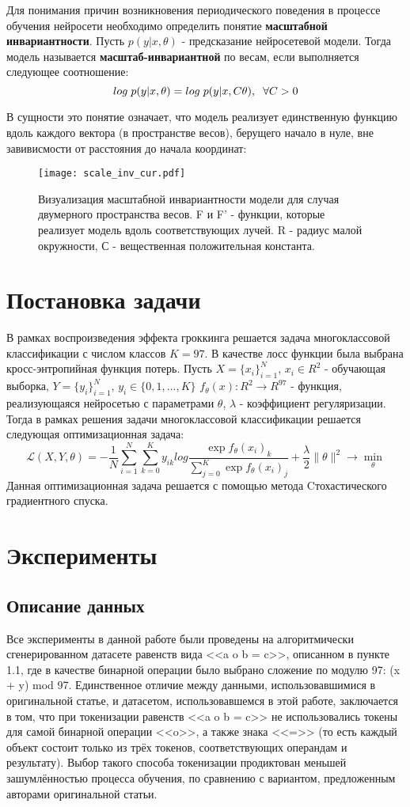 \documentclass{article}
\begin{document}
Для понимания причин возникновения периодического поведения в процессе обучения нейросети необходимо определить понятие \textbf{масштабной инвариантности}. Пусть $p(y|x, \theta)$ - предсказание нейросетевой модели. Тогда модель называется 
\textbf{масштаб-инвариантной} по весам, если выполняется следующее соотношение:
$$log \hspace{1mm} p(y|x, \theta) = log \hspace{1mm} p(y|x, C\theta), \hspace{2mm}\forall C > 0$$
\par В сущности это понятие означает, что модель реализует единственную функцию вдоль каждого вектора (в пространстве весов), берущего начало в нуле, вне завивисмости от расстояния до начала координат:
\begin{figure}[h]
\centering
\texttt{[image: scale\_inv\_cur.pdf]}
\caption{Визуализация масштабной инвариантности модели для случая двумерного пространства весов. F и F' - функции, которые реализует модель вдоль соответствующих лучей. R - радиус малой окружности, С - вещественная положительная константа.}
\label{fig:fig4}
\end{figure}
\section{Постановка задачи}
В рамках воспроизведения эффекта гроккинга решается задача многоклассовой классификации с числом классов $K=97$. В качестве лосс функции была выбрана кросс-энтропийная функция потерь. Пусть $X = \{{x_i}\}_{i=1}^N$, $x_i \in R^2$ - обучающая выборка,  $Y = \{{y_i}\}_{i=1}^N$, $y_i \in \{0, 1, ...,K\}$  $f_{\theta}(x): R^2 \rightarrow R^{97}$ - функция, реализующаяся нейросетью с параметрами $\theta$, $\lambda$ - коэффициент регуляризации. Тогда в рамках решения задачи многоклассовой классификации решается следующая оптимизационная задача:
$$\mathcal{L}(X, Y, \theta) = -\frac{1}{N} \sum_{i=1}^N\sum_{k=0}^K{y_{ik} log{\frac{\exp{f_{\theta}(x_i)_k}}{\sum_{j=0}^K{\exp{f_{\theta}(x_i)_j}}}}} + \frac{\lambda}{2}\|\theta\|^2 \rightarrow\min_{\theta}$$
Данная оптимизационная задача решается с помощью метода Cтохастического градиентного спуска.
\section{Эксперименты}
\subsection{Описание данных}
Все эксперименты в данной работе были проведены на алгоритмически сгенерированном датасете равенств вида <<a o b = c>>, описанном в пункте 1.1, где в качестве бинарной операции было выбрано сложение по модулю 97: (x + y) mod 97. Единственное отличие между данными, использовавшимися в оригинальной статье, и датасетом, использовавшемся в этой работе, заключается в том, что при токенизации равенств <<a o b = c>> не использовались токены для самой бинарной операции <<o>>, а также знака <<=>> (то есть каждый объект состоит только из трёх токенов, соответствующих операндам и результату). Выбор такого способа токенизации продиктован меньшей зашумлённостью процесса обучения, по сравнению с вариантом, предложенным авторами оригинальной статьи.
\end{document}
